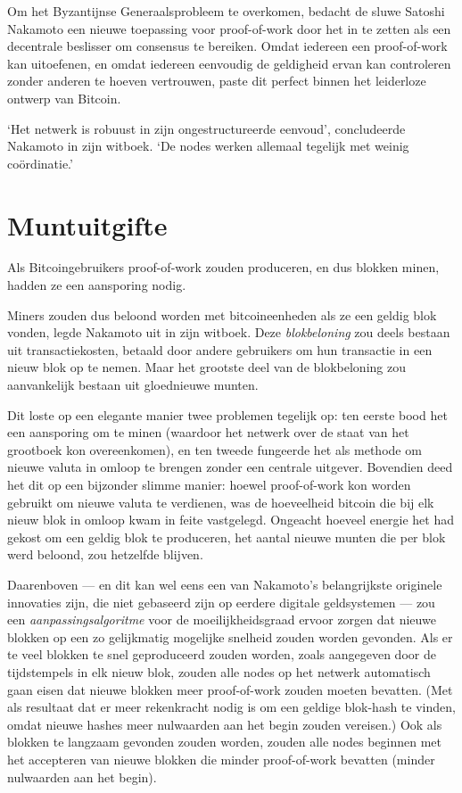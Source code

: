 \documentclass[
  a5paper,
  smalldemyvopaper,11pt,twoside,onecolumn,openright,extrafontsizes]{memoir}
\begin{document}
Om het Byzantijnse Generaalsprobleem te overkomen, bedacht de sluwe
Satoshi Nakamoto een nieuwe toepassing voor proof-of-work door het in te
zetten als een decentrale beslisser om consensus te bereiken. Omdat
iedereen een proof-of-work kan uitoefenen, en omdat iedereen eenvoudig
de geldigheid ervan kan controleren zonder anderen te hoeven vertrouwen,
paste dit perfect binnen het leiderloze ontwerp van Bitcoin.

`Het netwerk is robuust in zijn ongestructureerde eenvoud', concludeerde
Nakamoto in zijn witboek. `De nodes werken allemaal tegelijk met weinig
coördinatie.'

\section{Muntuitgifte}\label{muntuitgifte}

Als Bitcoingebruikers proof-of-work zouden produceren, en dus blokken
minen, hadden ze een aansporing nodig.

Miners zouden dus beloond worden met bitcoineenheden als ze een geldig
blok vonden, legde Nakamoto uit in zijn witboek. Deze
\emph{blokbeloning} zou deels bestaan uit transactiekosten, betaald door
andere gebruikers om hun transactie in een nieuw blok op te nemen. Maar
het grootste deel van de blokbeloning zou aanvankelijk bestaan uit
gloednieuwe munten.

Dit loste op een elegante manier twee problemen tegelijk op: ten eerste
bood het een aansporing om te minen (waardoor het netwerk over de staat
van het grootboek kon overeenkomen), en ten tweede fungeerde het als
methode om nieuwe valuta in omloop te brengen zonder een centrale
uitgever. Bovendien deed het dit op een bijzonder slimme manier: hoewel
proof-of-work kon worden gebruikt om nieuwe valuta te verdienen, was de
hoeveelheid bitcoin die bij elk nieuw blok in omloop kwam in feite
vastgelegd. Ongeacht hoeveel energie het had gekost om een geldig blok
te produceren, het aantal nieuwe munten die per blok werd beloond, zou
hetzelfde blijven.

Daarenboven --- en dit kan wel eens een van Nakamoto's belangrijkste
originele innovaties zijn, die niet gebaseerd zijn op eerdere digitale
geldsystemen --- zou een \emph{aanpassingsalgoritme} voor de
moeilijkheidsgraad ervoor zorgen dat nieuwe blokken op een zo
gelijkmatig mogelijke snelheid zouden worden gevonden. Als er te veel
blokken te snel geproduceerd zouden worden, zoals aangegeven door de
tijdstempels in elk nieuw blok, zouden alle nodes op het netwerk
automatisch gaan eisen dat nieuwe blokken meer proof-of-work zouden
moeten bevatten. (Met als resultaat dat er meer rekenkracht nodig is om
een geldige blok-hash te vinden, omdat nieuwe hashes meer nulwaarden aan
het begin zouden vereisen.) Ook als blokken te langzaam gevonden zouden
worden, zouden alle nodes beginnen met het accepteren van nieuwe blokken
die minder proof-of-work bevatten (minder nulwaarden aan het begin).
\end{document}
